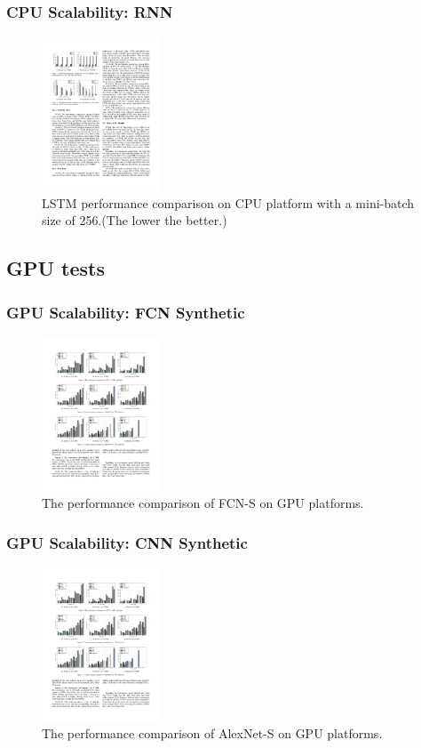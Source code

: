 
\begin{frame}
	\MyLogo
	\frametitle{CPU Scalability: RNN}  
	\begin{figure}[htbp] 
		\includegraphics[height=1.8in]{figures/LSTM1.pdf} 
		\caption{LSTM performance comparison on CPU platform with a mini-batch size of 256.(The lower the better.)}
	\end{figure}
\end{frame}

\subsection{GPU tests}

\begin{frame}
	\MyLogo
	\frametitle{GPU Scalability: FCN Synthetic}

	\begin{figure}[htbp] 
		\includegraphics[height=1.8in]{figures/FCN-S2.pdf} 
		\caption{The performance comparison of FCN-S on GPU platforms.}
	\end{figure}

\end{frame}


\begin{frame}
	\MyLogo
	\frametitle{GPU Scalability: CNN Synthetic}

	\begin{figure}[htbp] 
		\includegraphics[height=1.8in]{figures/AlexNet-S2.pdf} 
		\caption{The performance comparison of AlexNet-S on GPU platforms.}
	\end{figure}

\end{frame}


